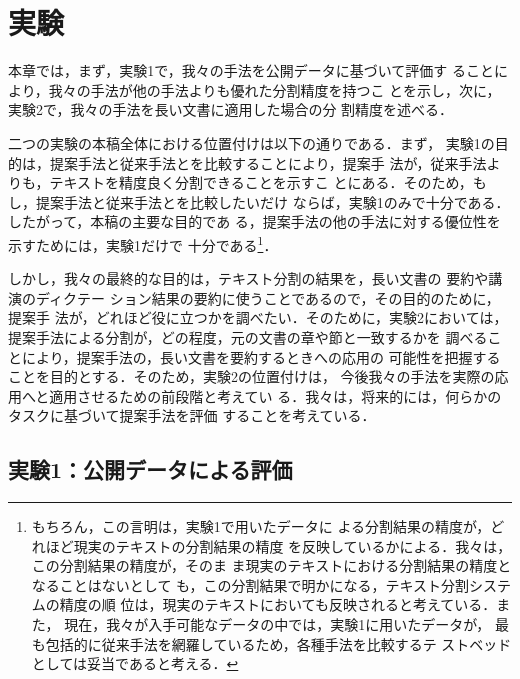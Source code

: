 \vspace*{5pt}

\section{実験}
\label{sec:experiments}

本章では，まず，実験1で，我々の手法を公開データに基づいて評価す
ることにより，我々の手法が他の手法よりも優れた分割精度を持つこ
とを示し，次に，実験2で，我々の手法を長い文書に適用した場合の分
割精度を述べる．

二つの実験の本稿全体における位置付けは以下の通りである．まず，
実験1の目的は，提案手法と従来手法とを比較することにより，提案手
法が，従来手法よりも，テキストを精度良く分割できることを示すこ
とにある．そのため，もし，提案手法と従来手法とを比較したいだけ
ならば，実験1のみで十分である．したがって，本稿の主要な目的であ
る，提案手法の他の手法に対する優位性を示すためには，実験1だけで
十分である\footnote{もちろん，この言明は，実験1で用いたデータに
  よる分割結果の精度が，どれほど現実のテキストの分割結果の精度
  を反映しているかによる．我々は，この分割結果の精度が，そのま
  ま現実のテキストにおける分割結果の精度となることはないとして
  も，この分割結果で明かになる，テキスト分割システムの精度の順
  位は，現実のテキストにおいても反映されると考えている．また，
  現在，我々が入手可能なデータの中では，実験1に用いたデータが，
  最も包括的に従来手法を網羅しているため，各種手法を比較するテ
  ストベッドとしては妥当であると考える．}．

しかし，我々の最終的な目的は，テキスト分割の結果を，長い文書の
要約\cite{nakao00:_algor_one_summar_long_text}や講演のディクテー
ション結果の要約に使うことであるので，その目的のために，提案手
法が，どれほど役に立つかを調べたい．そのために，実験2においては，
提案手法による分割が，どの程度，元の文書の章や節と一致するかを
調べることにより，提案手法の，長い文書を要約するときへの応用の
可能性を把握することを目的とする．そのため，実験2の位置付けは，
今後我々の手法を実際の応用へと適用させるための前段階と考えてい
る．我々は，将来的には，何らかのタスクに基づいて提案手法を評価
することを考えている．


\subsection{実験1：公開データによる評価}
\label{sec:exp1}

